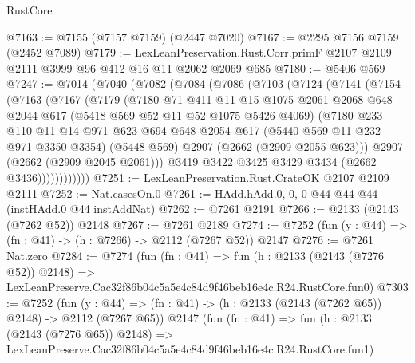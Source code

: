 \begin{lexlean}{RustCore}
\begin{coremodule}
@7163 := @7155 (@7157 @7159) (@2447 @7020)
@7167 := @2295 @7156 @7159 (@2452 @7089)
@7179 := LexLeanPreservation.Rust.Corr.primF
    @2107
    @2109
    @2111
    @3999
    @96
    @412
    @16
    @11
    @2062
    @2069
    @685
@7180 := @5406 @569
@7247 := @7014
    (@7040
      (@7082
        (@7084
          (@7086
            (@7103
              (@7124
                (@7141
                  (@7154
                    (@7163
                      (@7167
                        (@7179
                          (@7180
                            @71
                            @411
                            @11
                            @15
                            @1075
                            @2061
                            @2068
                            @648
                            @2044
                            @617
                            (@5418 @569 @52 @11 @52 @1075 @5426 @4069)
                            (@7180
                              @233
                              @110
                              @11
                              @14
                              @971
                              @623
                              @694
                              @648
                              @2054
                              @617
                              (@5440 @569 @11 @232 @971 @3350 @3354)
                              (@5448 @569)
                              @2907
                              (@2662 (@2909 @2055 @623)))
                            @2907
                            (@2662 (@2909 @2045 @2061)))
                          @3419
                          @3422
                          @3425
                          @3429
                          @3434
                          (@2662 @3436))))))))))))
@7251 := LexLeanPreservation.Rust.CrateOK @2107 @2109 @2111
@7252 := Nat.casesOn.{0}
@7261 := HAdd.hAdd.{0, 0, 0} @44 @44 @44 (instHAdd.{0} @44 instAddNat)
@7262 := @7261 @2191
@7266 := @2133 (@2143 (@7262 @52)) @2148
@7267 := @7261 @2189
@7274 := @7252 (fun (y : @44) => (fn : @41) -> (h : @7266) -> @2112 (@7267 @52)) @2147
@7276 := @7261 Nat.zero
@7284 := @7274
    (fun (fn : @41) =>
    fun (h : @2133 (@2143 (@7276 @52)) @2148) =>
    LexLeanPreserve.Cac32f86b04c5a5e4c84d9f46beb16e4c.R24.RustCore.fun0)
@7303 := @7252
    (fun (y : @44) => (fn : @41) -> (h : @2133 (@2143 (@7262 @65)) @2148) -> @2112 (@7267 @65))
    @2147
    (fun (fn : @41) =>
    fun (h : @2133 (@2143 (@7276 @65)) @2148) =>
    LexLeanPreserve.Cac32f86b04c5a5e4c84d9f46beb16e4c.R24.RustCore.fun1)

\end{coremodule}
\end{lexlean}
